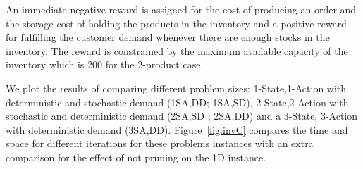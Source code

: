 An immediate negative reward is assigned for the cost of producing an order
and the storage cost of holding the products in the inventory and a
positive reward for fulfilling the customer demand whenever there are enough
stocks in the inventory. The reward is constrained by the maximum available capacity of the inventory which is 200 for the 2-product case.
%      			
%
% 
 
We plot the results of comparing different \InventoryControl problem sizes: 1-State,1-Action with deterministic and stochastic demand (1SA,DD; 1SA,SD), 2-State,2-Action with stochastic and deterministic demand (2SA,SD ; 2SA,DD) and a 3-State, 3-Action with deterministic demand (3SA,DD). Figure~\ref{fig:invC} compares the time and space
for different iterations for these problems instances with an extra
comparison for the effect of not pruning on the 1D instance. 

